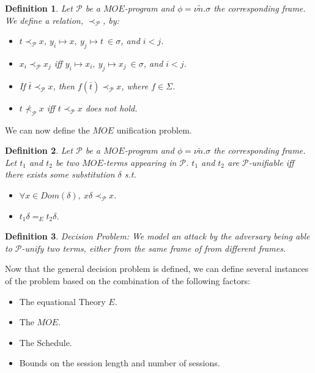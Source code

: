 \documentclass[11pt,twoside,a4paper]{article}
\newtheorem{definition}{Definition}
\begin{document}
\begin{definition}
	Let $\mathcal{P}$ be a $MOE$-program and $\phi = \nu \tilde{n}.\sigma$ the corresponding frame. We define a relation, 
	$\prec_{\mathcal{P}}$, by:
	\begin{itemize}
		\item $t \prec_{\mathcal{P}} x$,
		$y_i \mapsto x, ~y_j \mapsto t ~ \in \sigma$, and
		$ i < j$.
		\item $x_i \prec_{\mathcal{P}} x_j$ iff 
		 $y_i \mapsto x_i, ~y_j \mapsto x_j ~ \in \sigma$, and
		 $ i < j$.
		 \item If $\bar{t} \prec_{\mathcal{P}} x$, then 
		 $f(\bar{t}) \prec_{\mathcal{P}} x$, where $f \in \Sigma$.
		 \item $t \not \prec_{\mathcal{P}} x$ iff $t \prec_{\mathcal{P}} x$ does not hold.
	\end{itemize}
\end{definition}

We can now define the $MOE$ unification problem.

\begin{definition}
	Let $\mathcal{P}$ be a $MOE$-program and $\phi = \nu \tilde{n}.\sigma$ the corresponding frame. Let $t_1$ and $t_2$
	be two $MOE$-terms appearing in $\mathcal{P}$. $t_1$ and $t_2$
	are $\mathcal{P}$-unifiable iff there exists some substitution
	$\delta$ s.t.
	\begin{itemize}
		\item $\forall x \in Dom(\delta), ~x\delta \prec_{\mathcal{P}} x$.
		\item $t_1 \delta =_E t_2\delta$.
	\end{itemize}
\end{definition}


\begin{definition}
	Decision Problem: We model an attack by the adversary being able
	to $\mathcal{P}$-unify two terms, either from the same frame of from different
	frames.  
\end{definition}

Now that the general decision problem is defined, we can define several
instances of the problem based on the combination of the following factors:
\begin{itemize}
	\item The equational Theory $E$.
	\item The $MOE$.
	\item The Schedule.
	\item Bounds on the session length and number of sessions.  
\end{itemize}
\end{document}
